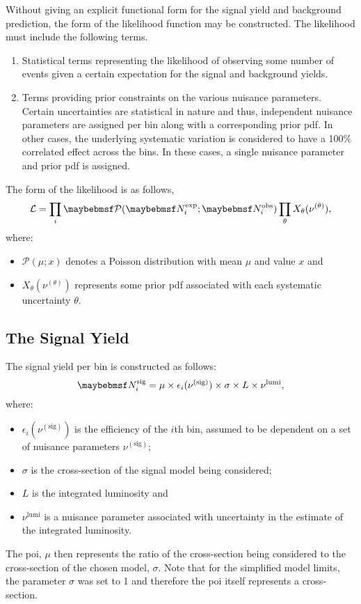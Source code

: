 Without giving an explicit functional form for the signal yield and background
prediction, the form of the likelihood function may be constructed. The
likelihood must include the following terms.
\begin{enumerate}
\item Statistical terms representing the likelihood of observing some number of
  events given a certain expectation for the signal and background yields.
\item Terms providing prior constraints on the various nuisance
  parameters. Certain uncertainties are statistical in nature and thus,
  independent nuisance parameters are assigned per bin along with a
  corresponding prior \ac{pdf}. In other cases,
  the underlying systematic variation is considered to have a 100\% correlated
  effect across the bins. In these cases, a single nuisance parameter and prior
  \ac{pdf} is assigned.
\end{enumerate}

The form of the likelihood is as follows,
\begin{equation*}
\mathcal{L} = \prod_i \Poisson(\NExpi ; \NObsi)
\prod_\theta  X_\theta(\nu^{(\theta)}),
\end{equation*}
where:
\begin{itemize}
\item $\mathcal{P}(\mu;x)$ denotes a Poisson distribution with mean $\mu$ and value
$x$ and
\item $X_\theta(\nu^{(\theta)})$ represents some prior \ac{pdf} associated with
  each systematic uncertainty $\theta$.
\end{itemize}

\subsection{The Signal Yield}
The signal yield per bin is constructed as follows:
\begin{equation*}
\NSigi = \mu \times \epsilon_i(\nu^{(\textrm{sig})}) \times \sigma \times L \times \nu^{\textrm{lumi}},
\end{equation*}
where:
\begin{itemize}
\item $\epsilon_i(\nu^{(\textrm{sig})})$ is the efficiency of the $i$th bin, assumed to be
  dependent on a set of nuisance parameters $\nu^{(\textrm{sig})}$;
\item $\sigma$ is the cross-section of the signal model being considered;
\item $L$ is the integrated luminosity and
\item $\nu^{\textrm{lumi}}$ is a nuisance parameter associated with uncertainty
  in the estimate of the integrated luminosity.
\end{itemize}
The \ac{poi}, $\mu$ then represents the ratio of the cross-section being
considered to the cross-section of the chosen model, $\sigma$. Note that for the
simplified model limits, the parameter $\sigma$ was set to 1 and therefore the
\ac{poi} itself represents a cross-section.

